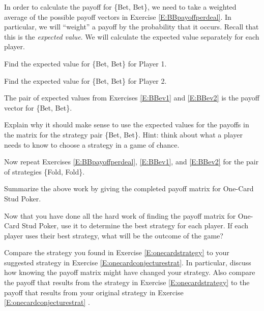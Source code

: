 In order to calculate the payoff for \{Bet, Bet\}, we need to take a weighted average of the possible payoff vectors in Exercise \ref{E:BBpayoffperdeal}. In particular, we will ``weight'' a payoff by the probability that it occurs. Recall that this is the \emph{expected value}. We will calculate the expected value separately for each player. 


\begin{xca}\label{E:BBev1}
Find the expected value for \{Bet, Bet\} for Player 1.
\end{xca}

\begin{xca}\label{E:BBev2}
Find the expected value for \{Bet, Bet\} for Player 2.
\end{xca}

The pair of expected values from Exercises \ref{E:BBev1} and \ref{E:BBev2} is the payoff vector for \{Bet, Bet\}.

\begin{xca}\label{E:BBexplain}
Explain why it should make sense to use the expected values for the payoffs in the matrix for the strategy pair \{Bet, Bet\}. Hint: think about what a player needs to know to choose a strategy in a game of chance.
\end{xca}

\begin{xca}\label{E:FF}
Now repeat Exercises \ref{E:BBpayoffperdeal}, \ref{E:BBev1}, and \ref{E:BBev2} for the pair of strategies \{Fold, Fold\}.
\end{xca}


\begin{xca}\label{E:onecardmatrix}
Summarize the above work by giving the completed payoff matrix for One-Card Stud Poker.
\end{xca} 


\begin{xca}\label{E:onecardstrategy}
Now that you have done all the hard work of finding the payoff matrix for One-Card Stud Poker, use it to determine the best strategy for each player. If each player uses their best strategy, what will be the outcome of the game?
\end{xca}

\begin{xca}\label{E:onecardcompare}
Compare the strategy you found in Exercise \ref{E:onecardstrategy} to your suggested strategy in Exercise \ref{E:onecardconjecturestrat}. In particular, discuss how knowing the payoff matrix might have changed your strategy. Also compare the payoff that results from the strategy in Exercise \ref{E:onecardstrategy} to the payoff that results from your original strategy in Exercise \ref{E:onecardconjecturestrat} .
\end{xca}

